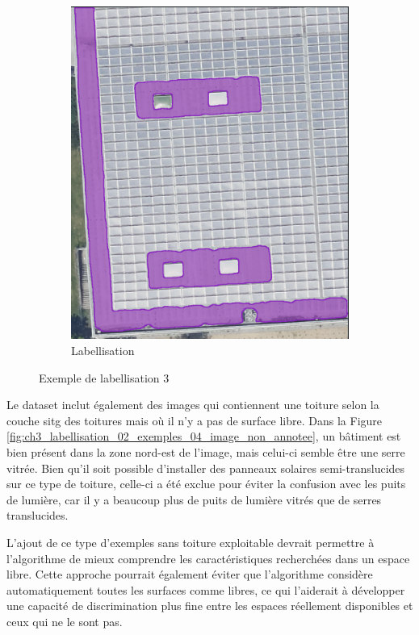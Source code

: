 \begin{figure}[H]
\begin{subfigure}[b]{0.49\textwidth}
        \includegraphics[width=\textwidth]{02-main/figures/ch3/ch3_labellisation_02_exemples_03_solaire2.png}
        \caption{Labellisation}
        \label{fig:ch3_labellisation_02_exemples_03_solaire2}
    \end{subfigure}
    \caption{Exemple de labellisation 3}
    \label{fig:labellisation_solaire_exemple}
\end{figure}

Le dataset inclut également des images qui contiennent une toiture selon la couche \acrshort{sitg} des toitures mais où il n'y a pas de surface libre. Dans la Figure \ref{fig:ch3_labellisation_02_exemples_04_image_non_annotee}, un bâtiment est bien présent dans la zone nord-est de l'image, mais celui-ci semble être une serre vitrée. Bien qu'il soit possible d'installer des panneaux solaires semi-translucides sur ce type de toiture, celle-ci a été exclue pour éviter la confusion avec les puits de lumière, car il y a beaucoup plus de puits de lumière vitrés que de serres translucides.

L'ajout de ce type d'exemples sans toiture exploitable devrait permettre à l'algorithme de mieux comprendre les caractéristiques recherchées dans un espace libre. Cette approche pourrait également éviter que l'algorithme considère automatiquement toutes les surfaces comme libres, ce qui l'aiderait à développer une capacité de discrimination plus fine entre les espaces réellement disponibles et ceux qui ne le sont pas.

